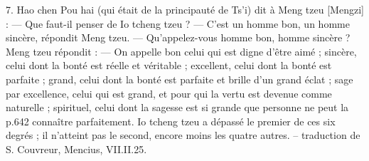 \begin{singlequote}
    7.	Hao chen Pou hai (qui était de la principauté de Ts’i) dit à Meng tzeu [Mengzi] :
—	Que faut-il penser de Io tcheng tzeu ?
—	C’est un homme bon, un homme sincère, répondit Meng tzeu.
—	Qu’appelez-vous homme bon, homme sincère ? Meng tzeu répondit :
—	On appelle bon celui qui est digne d’être aimé ; sincère, celui dont la bonté est réelle et véritable ; excellent, celui dont la bonté est parfaite ; grand, celui dont la bonté est parfaite et brille d’un grand éclat ; sage par excellence, celui qui est grand, et pour qui la vertu est devenue comme naturelle ; spirituel, celui dont la sagesse est si grande que personne ne peut la p.642 connaître parfaitement. Io tcheng tzeu a dépassé le premier de ces six degrés ; il n’atteint pas le second, encore moins les quatre autres.
-- traduction de S. Couvreur, Mencius, VII.II.25.
\end{singlequote}

